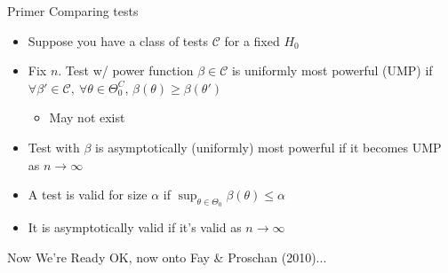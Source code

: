 \begin{frame}{Primer}
Comparing tests
\begin{itemize}
    \item Suppose you have a class of tests $\mathcal{C}$ for a fixed $H_0$
    \item Fix $n$. Test w/ power function $\beta\in\mathcal{C}$ is \alert{uniformly most powerful (UMP)} if $\forall \beta'\in\mathcal{C},\ \forall \theta\in\Theta_0^C$, $\beta(\theta)\geq\beta(\theta')$
    \begin{itemize}
        \item May not exist
    \end{itemize}
    \item Test with $\beta$ is asymptotically (uniformly) most powerful if it becomes UMP as $n\rightarrow \infty$
    \item A test is \alert{valid} for size $\alpha$ if $\sup_{\theta\in\Theta_0}\beta(\theta)\leq \alpha$
    \item It is \alert{asymptotically valid} if it's valid as $n\rightarrow\infty$
\end{itemize}
\end{frame}


\begin{frame}{Now We're Ready}
    OK, now onto Fay \& Proschan (2010)...
\end{frame}

